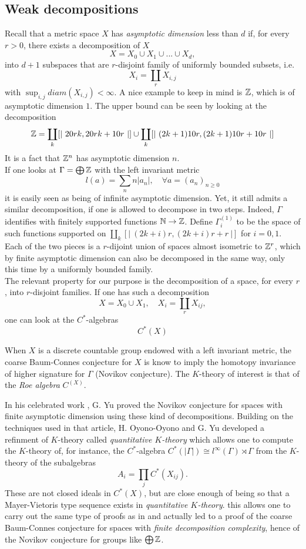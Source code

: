 \subsection{Weak decompositions}

Recall that a metric space $X$ has \textit{asymptotic dimension} less than $d$ if, for every $r>0$, there exists a decomposition of $X$
\[X = X_0 \cup X_1 \cup ... \cup X_d,\]
into $d+1$ subspaces that are $r$-disjoint family of uniformly bounded subsets, i.e. \[X_i = \coprod_r X_{i,j}\] with $\sup_{i,j} diam(X_{i,j})<\infty$. A nice example to keep in mind is $\mathbb{Z}$, which is of asymptotic dimension $1$. The upper bound can be seen by looking at the decomposition 
\[ \mathbb{Z} = \coprod_k [| \ 20rk, 20rk+10r \ |] \cup \coprod_k [| \  (2k+1)10r , (2k+1)10r+10r \ |] \] It is a fact that $\mathbb{Z}^n$ has asymptotic dimension $n$. \\

If one looks at $\Gamma=\bigoplus \mathbb{Z}$ with the left invariant metric 
\[ l(a)= \sum_n n|a_n|, \quad \forall a = (a_n)_{n \geq 0}\] it is easily seen as being of infinite asymptotic dimension. Yet, it still admits a similar decomposition, if one is allowed to decompose in two steps. Indeed, $\Gamma$ identifies with finitely supported functions $\mathbb{N} \rightarrow \mathbb{Z}$. Define $\Gamma_i^{(1)}$ to be the space of such functions supported on $\coprod_k [| \ (2k+i)r, (2k+i)r+r \ |]$ for $i=0,1$. Each of the two pieces is a $r$-dijoint union of spaces almost isometric to $\mathbb{Z}^r$, which by finite asymptotic dimension can also be decomposed in the same way, only this time by a uniformly bounded family.\\ 

The relevant property for our purpose is the decomposition of a space, for every $r$, into $r$-disjoint families. If one has such a decomposition
\[X = X_0 \cup X_1 , \quad X_i = \coprod_r X_{ij},\]
one can look at the $C^*$-algebras
\[C^*(X)\] 

When $X$ is a discrete countable group endowed with a left invariant metric, the coarse Baum-Connes conjecture for $X$ is know to imply the homotopy invariance of higher signature for $\Gamma$ (Novikov conjecture). The $K$-theory of interest is that of the \textit{Roe algebra} $C^(X)$. 

In his celebrated work \cite{Yu1}, G. Yu proved the Novikov conjecture for spaces with finite asymptotic dimension using these kind of decompositions. Building on the techniques used in that article, H. Oyono-Oyono and G. Yu developed a refinment of $K$-theory called \textit{quantitative $K$-theory} which allows one to compute the $K$-theory of, for instance, the $C^*$-algebra $C^*(|\Gamma|) \cong l^\infty(\Gamma)\rtimes \Gamma$ from the $K$-theory of the subalgebras 
\[A_i = \prod_{j} C^*(X_{ij}).\]
These are not closed ideals in $C^*(X)$, but are close enough of being so that a Mayer-Vietoris type sequence exists in \textit{quantitative $K$-theory}. this allows one to carry out the same type of proofs as in \cite{Yu1} and actually led to a proof of the coarse Baum-Connes conjecture for spaces with \textit{finite decomposition complexity}, hence of the Novikov conjecture for groups like $\bigoplus \mathbb{Z}$.  \\

